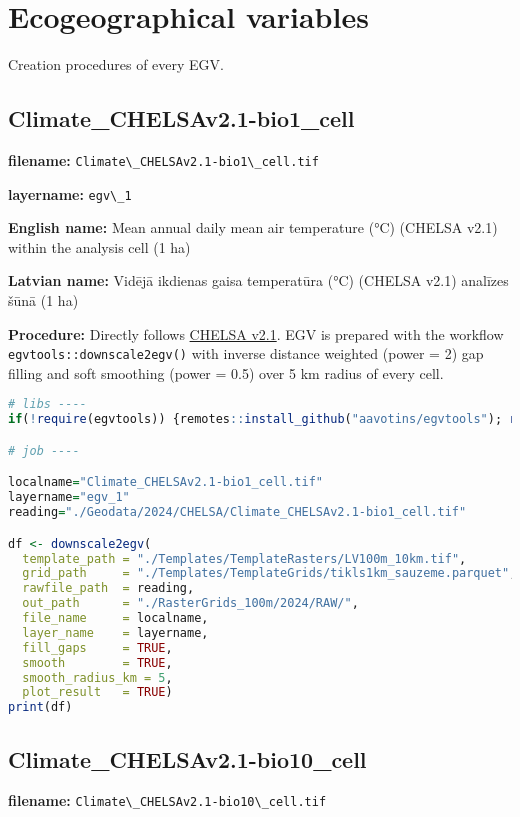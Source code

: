 \documentclass[
]{book}
\newcommand{\passthrough}[1]{#1}
\begin{document}
\chapter{Ecogeographical variables}\label{Ch06}

Creation procedures of every EGV.

\section{Climate\_CHELSAv2.1-bio1\_cell}\label{ch06.001}

\textbf{filename:} \passthrough{\lstinline!Climate\_CHELSAv2.1-bio1\_cell.tif!}

\textbf{layername:} \passthrough{\lstinline!egv\_1!}

\textbf{English name:} Mean annual daily mean air temperature (°C) (CHELSA v2.1) within the analysis cell (1 ha)

\textbf{Latvian name:} Vidējā ikdienas gaisa temperatūra (°C) (CHELSA v2.1) analīzes šūnā (1 ha)

\textbf{Procedure:} Directly follows \hyperref[Ch04.11]{CHELSA v2.1}. EGV is prepared with the
workflow \passthrough{\lstinline!egvtools::downscale2egv()!} with inverse distance weighted (power = 2)
gap filling and soft smoothing (power = 0.5) over 5 km radius of every cell.

\begin{lstlisting}[language=R]
# libs ----
if(!require(egvtools)) {remotes::install_github("aavotins/egvtools"); require(egvtools)}

# job ----

localname="Climate_CHELSAv2.1-bio1_cell.tif"
layername="egv_1"
reading="./Geodata/2024/CHELSA/Climate_CHELSAv2.1-bio1_cell.tif"

df <- downscale2egv(
  template_path = "./Templates/TemplateRasters/LV100m_10km.tif",
  grid_path     = "./Templates/TemplateGrids/tikls1km_sauzeme.parquet",
  rawfile_path  = reading,
  out_path      = "./RasterGrids_100m/2024/RAW/",
  file_name     = localname,
  layer_name    = layername,
  fill_gaps     = TRUE,
  smooth        = TRUE,
  smooth_radius_km = 5,
  plot_result   = TRUE)
print(df)
\end{lstlisting}

\section{Climate\_CHELSAv2.1-bio10\_cell}\label{ch06.002}

\textbf{filename:} \passthrough{\lstinline!Climate\_CHELSAv2.1-bio10\_cell.tif!}
\end{document}
